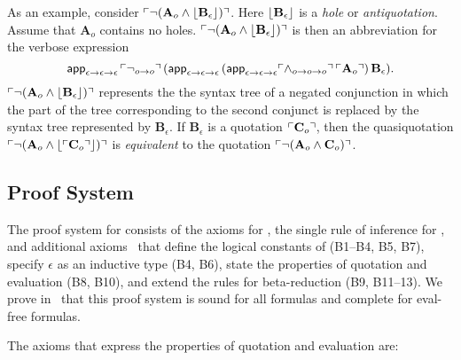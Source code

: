 \documentclass[fleqn]{llncs}
\begin{document}
As an example, consider $\ulcorner\neg(\textbf{A}_o \wedge
  \lfloor\textbf{B}_\epsilon\rfloor)\urcorner$. Here $\lfloor\textbf{B}_\epsilon\rfloor$
is a \emph{hole} or \emph{antiquotation}. Assume that
$\textbf{A}_o$ contains no holes.  $\ulcorner\neg(\textbf{A}_o \wedge
  \lfloor\textbf{B}_\epsilon\rfloor)\urcorner$ is then an abbreviation for the
verbose expression
\[\mbox{\sf app}_{\epsilon \rightarrow
  \epsilon \rightarrow \epsilon} \, \ulcorner\neg_{o \rightarrow o}\urcorner \,
(\mbox{\sf app}_{\epsilon \rightarrow \epsilon \rightarrow \epsilon} \,
(\mbox{\sf app}_{\epsilon \rightarrow \epsilon \rightarrow \epsilon}
\ulcorner\wedge_{o \rightarrow o \rightarrow o}\urcorner \, \ulcorner\textbf{A}_o\urcorner)
\, \textbf{B}_\epsilon).\] $\ulcorner\neg(\textbf{A}_o \wedge
  \lfloor\textbf{B}_\epsilon\rfloor)\urcorner$ represents the the syntax tree
of a negated conjunction in which the part of the tree corresponding
to the second conjunct is replaced by the syntax tree represented by
$\textbf{B}_\epsilon$.  If $\textbf{B}_\epsilon$ is a quotation
$\ulcorner\textbf{C}_o\urcorner$, then the quasiquotation
$\ulcorner\neg(\textbf{A}_o \wedge
  \lfloor\ulcorner\textbf{C}_o\urcorner\rfloor)\urcorner$ is \emph{equivalent} to the
quotation $\ulcorner\neg(\textbf{A}_o \wedge \textbf{C}_o)\urcorner$.

\subsection{Proof System}\label{subsec:cttqe-proof-system}

The proof system for {\churchqe} consists of the axioms for {\qzero},
the single rule of inference for {\qzero}, and additional
axioms~\cite[B1--B13]{Farmer18} that define the logical constants
of {\churchqe} (B1--B4, B5, B7), specify $\epsilon$ as an inductive type
(B4, B6), state the properties of quotation and evaluation (B8, B10),
and extend the rules for beta-reduction (B9, B11--13).  We prove
in~\cite{Farmer18} that this proof system is sound for all
formulas and complete for eval-free formulas.

The axioms that express the properties of quotation and evaluation are:

\medskip
\end{document}

